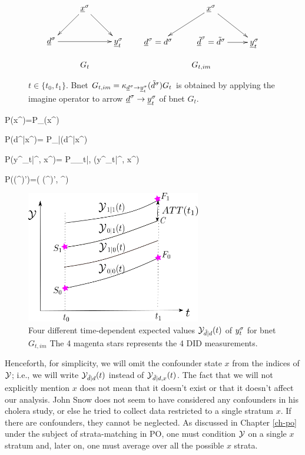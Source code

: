 \begin{figure}[h!]
$$
\begin{array}{ccccc}
\xymatrix{
&\rvx^\s\ar[dl]\ar[dr]
\\
\rvd^\s\ar[rr]&&\rvy^\s_t
}
&&
\xymatrix{
&\rvx^\s\ar[dl]\ar[dr]
\\
\rvd^\s=d^\s&\rvtd^\s=\td^\s\ar[r]&\rvy^\s_t
}
\\
\\
G_t&&G_{t, im}
\end{array}
$$
\caption{$t\in \{t_0, t_1\}$.
Bnet 
$G_{t, im}= \kappa_{{\underline{d}}^\sigma\rightarrow{\underline{y}}^\sigma_t}
({\tilde{d}}^\sigma)G_t$
is obtained by applying 
the imagine operator to arrow 
${\underline{d}}^\sigma\rightarrow{\underline{y}}^\sigma_t$
of bnet $G_t$.}
\label{fig-did-G_t-im}
\end{figure}

\beq\color{blue}
P(x^\s)=P_\rvx(x^\s)
\eeq

\beq\color{blue}
P(d^\s|x^\s)= 
P_{\rvd|\rvx}(d^\s|x^\s)
\eeq
 
\beq\color{blue}
P(y^\s_t|\td^\s, x^\s)=
P_{\rvy_t|\rvd, \rvx}(y^\s_t|\td^\s, x^\s)
\eeq

\beq\color{blue}
P((\td^\s)')=\delta(
(\td^\s)', \td^\s)
\eeq

\begin{figure}[h!]
\centering
\includegraphics[width=3in]
{did/dif-dif-bc.png}
\caption{
Four different time-dependent
expected 
values ${\cal Y}_{{\tilde{d}}|d}(t)$ of $y^\sigma_t$
for bnet $G_{t, im}$
The 4 magenta  stars
represents the 4 DID measurements.
} 
\label{fig-dif-dif-bc}
\end{figure}

Henceforth, 
for simplicity, we will
omit the confounder state $x$
from the indices of ${\cal Y}$; i.e., we will write
${\cal Y}_{{\tilde{d}}|d}(t)$
instead of ${\cal Y}_{{\tilde{d}}|d, x}(t)$.
The fact that we will
not explicitly
mention $x$ does not
mean that it doesn't exist
or that it doesn't affect our analysis.
John Snow
does not seem to have considered any confounders
in his cholera study,
or else he tried to collect 
data restricted to a single stratum $x$.
If there are confounders,
they cannot be neglected.
As discussed in Chapter \ref{ch-po}
under the subject of strata-matching in PO,
one must condition ${\cal Y}$
on a single $x$ stratum
and, later on,  one must average
over all the possible $x$ strata.


